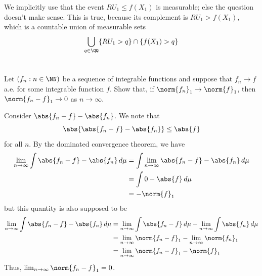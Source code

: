 \documentclass[11pt, headheight=30pt]{scrartcl}
\begin{document}
We implicitly use that the event
$RU_1 \leq f(X_1)$ is measurable; else the question
doesn't make sense. This is true, because its complement
is $RU_1 > f(X_1)$, which is a countable union of
measurable sets
\[
    \bigcup_{q\in \QQ} \{RU_1 > q\} \cap \{f(X_1) > q\}
\]

\section{}
\begin{prob*}
    Let $(f_n : n \in \NN)$ be a sequence of integrable functions and suppose that
    $f_n \to f$ a.e. for some integrable function $f$. Show that, if $\norm{f_n}_1 \to \norm{f}_1$,
    then $\norm{f_n - f}_1 \to 0$ as $n \to \infty$.
\end{prob*}

Consider $\abs{f_n - f} - \abs{f_n}$. We note that
\[
    \abs{\abs{f_n - f} - \abs{f_n}} \leq \abs{f}    
\]
for all $n$. By the dominated convergence theorem, we have
\begin{align*}
    \lim_{n\to \infty} \int \abs{f_n - f} - \abs{f_n} \, d\mu &= \int \lim_{n\to \infty} \abs{f_n - f} - \abs{f_n} \, d\mu\\
    &= \int 0 - \abs{f} \, d\mu \\
    &= -\norm{f}_1
\end{align*}
but this quantity is also supposed to be
\begin{align*}
    \lim_{n\to \infty} \int \abs{f_n - f} - \abs{f_n} \, d\mu &= \lim_{n\to \infty} \int \abs{f_n - f} \, d\mu - \lim_{n\to \infty} \int \abs{f_n} \, d\mu \\
    &= \lim_{n\to \infty} \norm{f_n - f}_1 - \lim_{n\to \infty} \norm{f_n}_1 \\
    &= \lim_{n\to \infty} \norm{f_n - f}_1  - \norm{f}_1
\end{align*}
Thus, $\lim_{n\to \infty} \norm{f_n - f}_1 = 0$.
\end{document}
